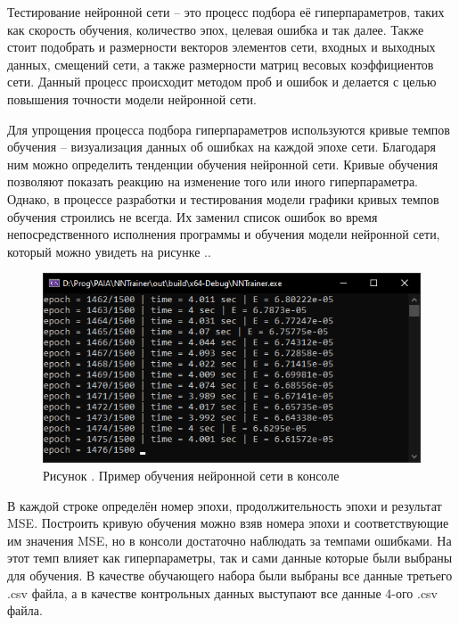 {\gostFont

  \par \redline Тестирование нейронной сети {--} это процесс подбора её гиперпараметров, таких как скорость обучения, количество эпох, целевая ошибка и так далее. Также стоит подобрать и размерности векторов элементов сети, входных и выходных данных, смещений сети, а также размерности матриц весовых коэффициентов сети. Данный процесс происходит методом проб и ошибок и делается с целью повышения точности модели нейронной сети. 

  \par \redline Для упрощения процесса подбора гиперпараметров используются кривые темпов обучения {--} визуализация данных об ошибках на каждой эпохе сети. Благодаря ним можно определить тенденции обучения нейронной сети. Кривые обучения позволяют показать реакцию на изменение того или иного гиперпараметра. Однако, в процессе разработки и тестирования модели графики кривых темпов обучения строились не всегда. Их заменил список ошибок во время непосредственного исполнения программы и обучения модели нейронной сети, который можно увидеть на рисунке \thechaptercntr .\theimagecntr.

  \begin{figure}[H]
    \centering
    \def\svgwidth{\textwidth}
    \includegraphics[width=120mm]{images/CurvedLerning.png}
    \caption*{\gostFont Рисунок \thechaptercntr .\theimagecntr \spc {--} Пример обучения нейронной сети в консоле}
    \label{fig:CurvedLerning}
  \end{figure} \addtocounter{imagecntr}{1}

  \par \redline В каждой строке определён номер эпохи, продолжительность эпохи и результат MSE. Построить кривую обучения можно взяв номера эпохи и соответствующие им значения MSE, но в консоли достаточно наблюдать за темпами ошибками. На этот темп влияет как гиперпараметры, так и сами данные которые были выбраны для обучения. В качестве обучающего набора были выбраны все данные третьего .csv файла, а в качестве контрольных данных выступают все данные 4-ого .csv файла. 

}
